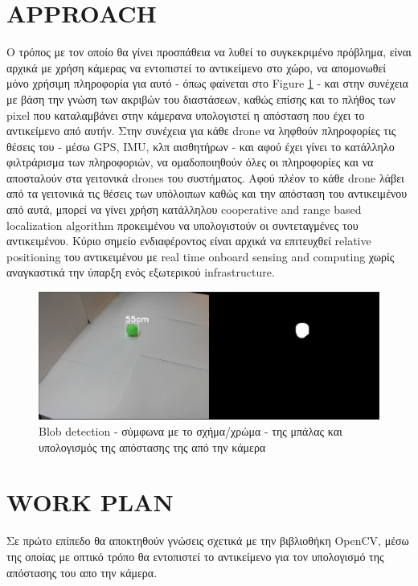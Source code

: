 \section{APPROACH}
Ο τρόπος με τον οποίο θα γίνει προσπάθεια να λυθεί το συγκεκριμένο πρόβλημα, είναι αρχικά με χρήση 
κάμερας να εντοπιστεί το αντικείμενο στο χώρο, να απομονωθεί μόνο χρήσιμη πληροφορία για αυτό   
- όπως φαίνεται στο Figure \ref{fig:2} - και στην συνέχεια με βάση την γνώση των ακριβών του διαστάσεων,
καθώς επίσης και το πλήθος των pixel που καταλαμβάνει στην κάμερα\udot να υπολογιστεί η απόσταση που 
έχει το αντικείμενο από αυτήν. Στην συνέχεια για κάθε drone να ληφθούν πληροφορίες τις θέσεις του - 
μέσω GPS, IMU, κλπ αισθητήρων -
και αφού έχει γίνει το κατάλληλο φιλτράρισμα των πληροφοριών, να ομαδοποιηθούν όλες οι πληροφορίες και 
να αποσταλούν στα γειτονικά drones του συστήματος. Αφού πλέον το κάθε drone λάβει από τα γειτονικά τις 
θέσεις των υπόλοιπων καθώς και την απόσταση του αντικειμένου από αυτά, μπορεί να γίνει χρήση κατάλληλου
cooperative and range based localization algorithm προκειμένου να υπολογιστούν οι συντεταγμένες του αντικειμένου.
Κύριο σημείο ενδιαφέροντος είναι αρχικά να επιτευχθεί relative positioning του αντικειμένου με real time 
onboard sensing and computing χωρίς αναγκαστικά την ύπαρξη ενός εξωτερικού infrastructure.



\begin{figure}[thpb]
  \centering
  \includegraphics[width=\linewidth]{Images/Thesis-Proposal-shape-color-detection.png}
  \caption{Blob detection - σύμφωνα με το σχήμα/χρώμα - της μπάλας και υπολογισμός της απόστασης της από την κάμερα}
  \label{fig:2}
\end{figure}

\section{WORK PLAN}
Σε πρώτο επίπεδο θα αποκτηθούν γνώσεις σχετικά με την βιβλιοθήκη OpenCV, μέσω της οποίας
με οπτικό τρόπο θα εντοπιστεί το αντικείμενο για τον υπολογισμό της απόστασης του απο την
κάμερα.

